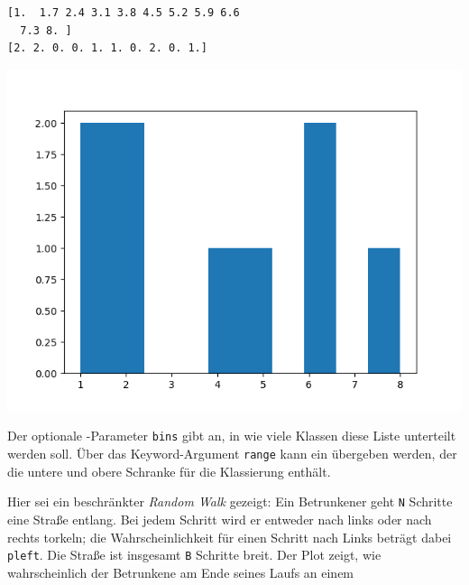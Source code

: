\begin{tcbraster}[raster columns=2,
                  raster equal height,
                  nobeforeafter,
                  raster column skip=0.5cm]
\begin{cmdbox}
\begin{verbatim}
[1.  1.7 2.4 3.1 3.8 4.5 5.2 5.9 6.6
  7.3 8. ]
[2. 2. 0. 0. 1. 1. 0. 2. 0. 1.]
\end{verbatim}
\end{cmdbox}
%
\begin{tcolorbox}[title=Plot: Einfaches Histogramm]
	\includegraphics[width=\linewidth]{./gfx/plt-hist-simple}
\end{tcolorbox}
\end{tcbraster}

Der optionale -Parameter \texttt{bins} gibt an, in wie viele Klassen diese Liste unterteilt werden soll. Über das Keyword-Argument \texttt{range} kann ein  übergeben werden, der die untere und obere Schranke für die Klassierung enthält. 

Hier sei ein beschränkter \emph{Random Walk} gezeigt: Ein Betrunkener geht \texttt{N} Schritte eine Straße entlang. Bei jedem Schritt wird er entweder nach links oder nach rechts torkeln; die Wahrscheinlichkeit für einen Schritt nach Links beträgt dabei \texttt{pleft}. Die Straße ist insgesamt \texttt{B} Schritte breit. Der Plot zeigt, wie wahrscheinlich der Betrunkene am Ende seines Laufs an einem 

